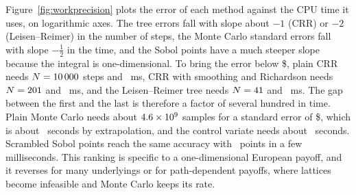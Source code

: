 Figure~\ref{fig:workprecision} plots the error of each method against the CPU time it uses, on logarithmic axes.
The tree errors fall with slope about $-1$ (CRR) or $-2$ (Leisen--Reimer) in the number of steps, the Monte Carlo standard errors fall with slope $-\tfrac12$ in the time, and the Sobol points have a much steeper slope because the integral is one-dimensional.
To bring the error below \$\WPtol, plain CRR needs $N=10\,000$ steps and \WPcrrMs\ ms, CRR with smoothing and Richardson needs $N=201$ and \WPsmMs\ ms, and the Leisen--Reimer tree needs $N=41$ and \WPlrMs\ ms.
The gap between the first and the last is therefore a factor of several hundred in time.
Plain Monte Carlo needs about $4.6\times10^{9}$ samples for a standard error of \$\WPtol, which is about \WPmcSec\ seconds by extrapolation, and the control variate needs about \WPcvSec\ seconds.
Scrambled Sobol points reach the same accuracy with \WPsobolM\ points in a few milliseconds.
This ranking is specific to a one-dimensional European payoff, and it reverses for many underlyings or for path-dependent payoffs, where lattices become infeasible and Monte Carlo keeps its rate.
